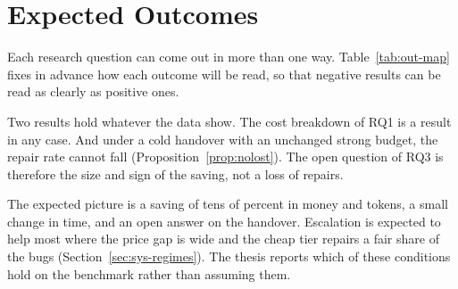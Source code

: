 \chapter{Expected Outcomes}
\label{ch:outcomes}

Each research question can come out in more than one way.
Table~\ref{tab:out-map} fixes in advance how each outcome will be read, so that
negative results can be read as clearly as positive ones.

Two results hold whatever the data show. The cost breakdown of RQ1 is a result
in any case. And under a cold handover with an unchanged strong budget, the
repair rate cannot fall (Proposition~\ref{prop:nolost}). The open question of
RQ3 is therefore the size and sign of the saving, not a loss of repairs.

The expected picture is a saving of tens of percent in money and tokens, a
small change in time, and an open answer on the handover. Escalation is
expected to help most where the price gap is wide and the cheap tier repairs a
fair share of the bugs (Section~\ref{sec:sys-regimes}). The thesis reports
which of these conditions hold on the benchmark rather than assuming them.

